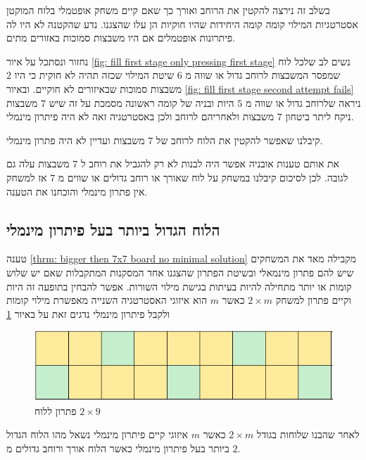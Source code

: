 \documentclass[12pt,twoside]{article}
\begin{document}
בשלב זה נירצה להקטין את הרוחב ואורך כך שאם קיים 
משחק אופטמלי בלוח המוקטן אסטרטגיות המילוי קומה קומה היחידות 
שהיו חוקיות הן עלו שהצגנו.
נדע שהקטנה לא היו לה פיתרונות אופטמלים אם היו משבצות סמוכות באזורים מתים.

נחזור ונסתכל על איור 
\ref{fig: fill first stage only pressing first stage}
נשים לב שלכל לוח שמפסר המשבצות לרוחב גדול או שווה 
מ
$6$
שיטת המילוי שכזה תהיה לא חוקית כי היו 
$2$
משבצות סמוכות שבאיזורים לא חוקיים.
ובאיור 
\ref{fig: fill first stage second attempt fails}
ניראה
שלרוחב גדול או שווה 
מ
$5$
היות ובניה
של קומה ראשונה מסמכת על זה שיש 
$7$
משבצות ניקח ליתר ביטחון 
$7$
משבצות ולאחריהם  לרוחב ולכן באסטרטגיה זאה לא היה פיתרון מינמלי.

קיבלנו שאפשר להקטין את הלוח לרוחב של
$7$
משבצות 
ועדיין לא היה פתרון  מינמלי. 

את אותם טענות אובניה אפשר היה לבנות לא רק להגביל את רוחב ל
$7$
משבצות עלה גם לגובה.
לכן לסיכום קיבלנו 
במשחק על לוח 
שאורך או רוחב גדולים או שווים מ
$7$
אז
למשחק אין פתרון מינמלי
והוכחנו את הטענה.


\subsection{הלוח הגדול ביותר בעל פיתרון מינמלי}

טענה 
\ref{thrm: bigger then 7x7 board no minimal solution} 
מקבילה מאד את המשחקים שיש להם פתרון מינמאלי ובשיטת הפתרון שהצגנו
אחד המסקנות המתקבלות שאם יש שלוש קומות או יותר מתחילה
להיות בעיתות בגישת מילוי השורות.
אפשר להבחין בתופעה זה היות וקיים פתרון למשחק 
$2 \times m$
כאשר 
$m$
הוא איזוגי
האסטרטגיה השנייה מאפשרת מילוי קומות ולקבל פיתרון מינמלי
נדגים זאת על באיור 
\ref{fig: 2x9 have min sol}

\begin{figure}[ht]
    \caption{פתרון ללוח 
    $2 \times 9$}
    \label{fig: 2x9 have min sol}
    \unsethebrew
    \centering
    \includegraphics[width=.7\textwidth,height=.7\textheight,keepaspectratio]{images/2xm_sol.PNG}
\end{figure}
\sethebrew

לאחר שהבנו שלוחות בגודל 
$2 \times m$
כאשר 
$m$
איזוגי 
קיים פיתרון מינמלי נשאל מהו הלוח 
הגדול ביותר
בעל פיתרון מינמלי כאשר 
הלוח אורך ורוחב גדולים מ
$2$.
\end{document}
